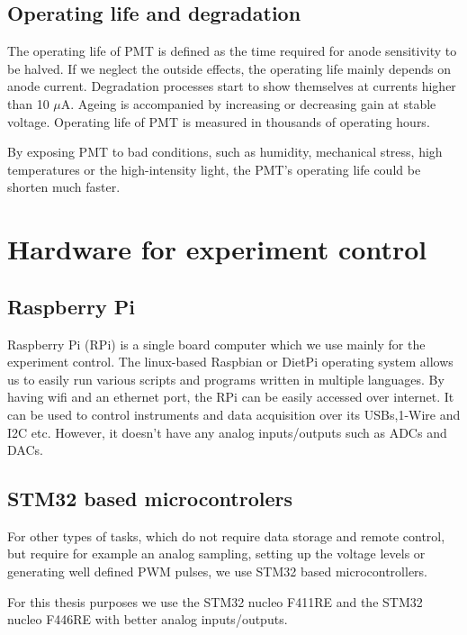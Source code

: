 \subsection{Operating life and degradation}
The operating life of PMT is defined as the time required for anode sensitivity to be halved. If we neglect the outside effects, the operating life mainly depends on anode current. 
Degradation processes start to show themselves at currents higher than 10 $\mu$A. Ageing is accompanied by increasing or decreasing gain at stable voltage. Operating life of PMT is measured in thousands of operating hours.
\par
By exposing PMT to bad conditions, such as humidity, mechanical stress, high temperatures or the high-intensity light, the PMT's operating life could be shorten much faster.

\section{Hardware for experiment control}

\subsection{Raspberry Pi}
Raspberry Pi (RPi) is a single board computer which we use mainly for the experiment control. The linux-based Raspbian or DietPi operating system allows us to easily run various scripts and programs written in multiple languages. By having wifi and an ethernet port, the RPi can be easily accessed over internet. It can be used to control instruments and data acquisition over its USBs,1-Wire and I2C etc. However, it doesn't have any analog inputs/outputs such as ADCs and DACs.
\subsection{STM32 based microcontrolers}
For other types of tasks, which do not require data storage and remote control, but require for example an analog sampling, setting up the voltage levels or generating well defined PWM pulses, we use STM32 based microcontrollers. 
\par
For this thesis purposes we use the STM32 nucleo F411RE and the STM32 nucleo F446RE with better analog inputs/outputs.
